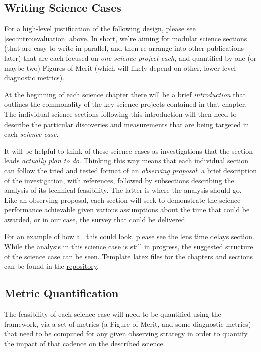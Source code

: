 \subsection{Writing Science Cases}

For a high-level justification of the following design, please see
\autoref{sec:intro:evaluation} above. In short, we're aiming for modular
science sections (that are easy to write in parallel, and then
re-arrange into other publications later) that are each focused on {\it
one science project each}, and quantified by one (or maybe two) Figures
of Merit (which will likely depend on other, lower-level diagnostic
metrics).

At the beginning of each science chapter there will be a brief
\textit{introduction} that outlines the commonality of the key science
projects contained in that chapter. The individual science sections
following this introduction will then need to describe the particular
discoveries and measurements that are being targeted in each
\textit{science case}.

It will be helpful to think of these science
cases as investigations that the section leads {\it actually plan to
do}. Thinking this way means that each individual section can follow the
tried and tested format of an {\it observing proposal}: a brief
description of the investigation, with references, followed by subsections
describing the analysis
of its technical feasibility. The latter is where the \MAF analysis
should go. Like an observing proposal, each section will seek to
demonstrate the science performance achievable given various assumptions
about the time that could be awarded, or in our case, the survey that
could be delivered.

For an example of how all this could look, please see the
\hyperref[sec:lenstimedelays]{lens time delays section}. While the \MAF
analysis in this science case is still in progress, the suggested
structure of the science case can be seen. Template latex files for the
chapters and sections can be found in the
\href{https://github.com/LSSTScienceCollaborations/ObservingStrategy}{\GitHub
repository}.


\subsection{Metric Quantification}
\label{sec:\secname:metrics}

The feasibility of each science case will need to be quantified using
the \MAF framework, via a set of metrics (a Figure of Merit, and some
diagnostic metrics)  that need to be computed for any given observing
strategy in order to quantify the impact of that cadence on the
described science.

